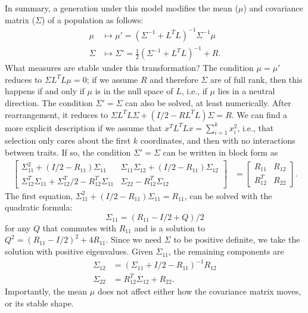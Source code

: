 \documentclass{article}
\newcommand{\1}{\mathbbm{1}}
\begin{document}
In summary, a generation under this model modifies the mean ($\mu$)
and covariance matrix ($\Sigma$) of a population as follows:
\begin{align*}
    \mu &\mapsto \mu' = (\Sigma^{-1}+L^T L)^{-1} \Sigma^{-1} \mu \\
    \Sigma &\mapsto \Sigma' = \frac{1}{2} (\Sigma^{-1} + L^T L)^{-1} + R .
\end{align*}
What measures are stable under this transformation?
The condition $\mu = \mu'$ reduces to $\Sigma L^T L \mu = 0$;
if we assume $R$ and therefore $\Sigma$ are of full rank,
then this happens if and only if $\mu$ is in the null space of $L$,
i.e., if $\mu$ lies in a neutral direction.
The condition $\Sigma' = \Sigma$ can also be solved,
at least numerically.
After rearrangement, it reduces to
$\Sigma L^T L \Sigma + (I/2 - R L^T L) \Sigma = R$.
We can find a more explicit description
if we assume that $x^T L^T L x = \sum_{i=1}^k x_i^2$,
i.e., that selection only cares about the first $k$ coordinates,
and then with no interactions between traits.
If so, the condition $\Sigma' = \Sigma$
can be written in block form as
\begin{align*}
    \begin{bmatrix}
        \Sigma_{11}^2 + (I/2 - R_{11}) \Sigma_{11}
        & \Sigma_{11} \Sigma_{12} + (I/2 - R_{11})\Sigma_{12} \\
        \Sigma_{12}^T \Sigma_{11} + \Sigma_{12}^T/2 - R_{12}^T \Sigma_{11}
        & \Sigma_{22} - R_{12}^T \Sigma_{12} 
    \end{bmatrix}
    &=
    \begin{bmatrix}
        R_{11} & R_{12} \\
        R_{12}^T & R_{22}
    \end{bmatrix} .
\end{align*}
The first equation, $\Sigma_{11}^2 + (I/2 - R_{11}) \Sigma_{11} = R_{11}$,
can be solved with the quadratic formula: 
$$\Sigma_{11} = (R_{11} - I/2 + Q)/2$$
for any $Q$ that commutes with $R_{11}$
and is a solution to $Q^2 = (R_{11} - I/2)^2 + 4 R_{11}$.
Since we need $\Sigma$ to be positive definite,
we take the solution with positive eigenvalues.
Given $\Sigma_{11}$, the remaining components are
\begin{align*}
    \Sigma_{12} 
    &= 
    \left( \Sigma_{11} + I/2 - R_{11} \right)^{-1} R_{12} \\
    \Sigma_{22}
    &=
    R_{12}^T \Sigma_{12} + R_{22} .
\end{align*}
Importantly, the mean $\mu$ does not affect 
either how the covariance matrix moves,
or its stable shape.
\end{document}
